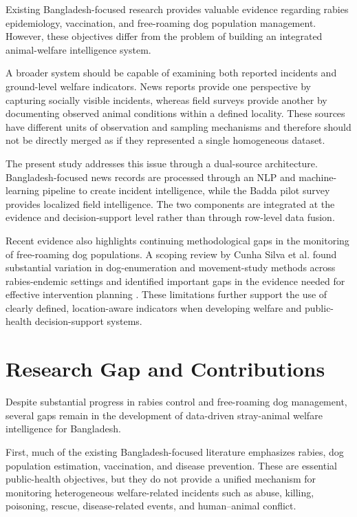 \documentclass[conference]{IEEEtran}
\begin{document}
Existing Bangladesh-focused research provides valuable evidence regarding
rabies epidemiology, vaccination, and free-roaming dog population management.
However, these objectives differ from the problem of building an integrated
animal-welfare intelligence system.

A broader system should be capable of examining both reported incidents and
ground-level welfare indicators. News reports provide one perspective by
capturing socially visible incidents, whereas field surveys provide another
by documenting observed animal conditions within a defined locality. These
sources have different units of observation and sampling mechanisms and
therefore should not be directly merged as if they represented a single
homogeneous dataset.

The present study addresses this issue through a dual-source architecture.
Bangladesh-focused news records are processed through an NLP and
machine-learning pipeline to create incident intelligence, while the Badda
pilot survey provides localized field intelligence. The two components are
integrated at the evidence and decision-support level rather than through
row-level data fusion.

Recent evidence also highlights continuing methodological gaps in the
monitoring of free-roaming dog populations. A scoping review by Cunha Silva
et al. found substantial variation in dog-enumeration and movement-study
methods across rabies-endemic settings and identified important gaps in the
evidence needed for effective intervention planning
\cite{cunhasilva2025}. These limitations further support the use of clearly
defined, location-aware indicators when developing welfare and
public-health decision-support systems.


\section{Research Gap and Contributions}

Despite substantial progress in rabies control and free-roaming dog
management, several gaps remain in the development of data-driven
stray-animal welfare intelligence for Bangladesh.

First, much of the existing Bangladesh-focused literature emphasizes rabies,
dog population estimation, vaccination, and disease prevention. These are
essential public-health objectives, but they do not provide a unified
mechanism for monitoring heterogeneous welfare-related incidents such as
abuse, killing, poisoning, rescue, disease-related events, and
human--animal conflict.
\end{document}
